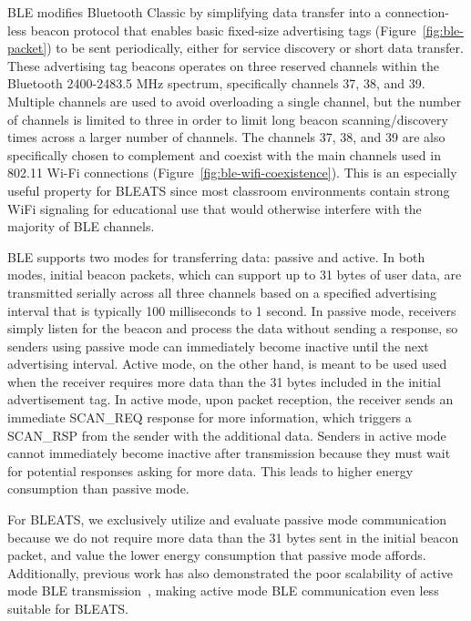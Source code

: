 BLE modifies Bluetooth Classic by simplifying data transfer into a
connection-less beacon protocol that enables basic fixed-size advertising tags
(Figure~\ref{fig:ble-packet})  to be sent periodically, either for service
discovery or short data transfer. These advertising tag beacons operates on
three reserved channels within the Bluetooth 2400-2483.5 MHz spectrum,
specifically channels 37, 38, and 39. Multiple channels are used to avoid
overloading a single channel, but the number of channels is limited to three in
order to limit long beacon scanning/discovery times across a larger number of
channels. The channels 37, 38, and 39 are also specifically chosen to
complement and coexist with the main channels used in 802.11 Wi-Fi connections
(Figure~\ref{fig:ble-wifi-coexistence}). This is an especially useful property
for BLEATS since most classroom environments contain strong WiFi signaling for
educational use that would otherwise interfere with the majority of BLE
channels.

BLE supports two modes for transferring data: passive and active. In both
modes, initial beacon packets, which can support up to 31 bytes of user data,
are transmitted serially across all three channels based on a specified
advertising interval that is typically 100 milliseconds to 1 second. In passive
mode, receivers simply listen for the beacon and process the data without
sending a response, so senders using passive mode can immediately become
inactive until the next advertising interval. Active mode, on the other hand,
is meant to be used used when the receiver requires more data than the 31 bytes
included in the initial advertisement tag. In active mode, upon packet
reception, the receiver sends an immediate SCAN\_REQ response for more
information, which triggers a SCAN\_RSP from the sender with the additional
data. Senders in active mode cannot immediately become inactive after
transmission because they must wait for potential responses asking for more
data. This leads to higher energy consumption than passive mode. 

For BLEATS, we exclusively utilize and evaluate passive mode communication
because we do not require more data than the 31 bytes sent in the initial
beacon packet, and value the lower energy consumption that passive mode
affords. Additionally, previous work has also demonstrated the poor scalability
of active mode BLE transmission~\cite{robin-ble}, making active mode BLE
communication even less suitable for BLEATS.




